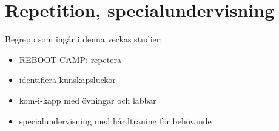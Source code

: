 \chapter{Repetition, specialundervisning}\label{chapter:W08}
Begrepp som ingår i denna veckas studier:
\begin{itemize}[noitemsep,label={$\square$},leftmargin=*]
\item REBOOT CAMP: repetera
\item identifiera kunskapsluckor
\item kom-i-kapp med övningar och labbar
\item specialundervisning med hårdträning för behövande\end{itemize}
